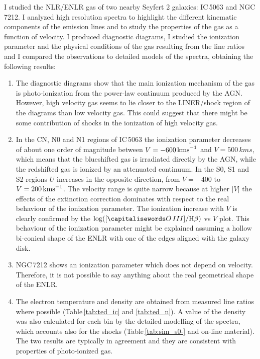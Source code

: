 \documentclass[../thesis.tex]{subfiles}
\begin{document}
I studied the NLR/ENLR gas of two nearby Seyfert 2 galaxies: IC\,5063 and NGC\,7212.
I analyzed high resolution spectra to highlight the different kinematic components of the emission lines and to study the properties of the gas as a function of velocity.
I produced diagnostic diagrams, I studied the ionization parameter and the physical conditions
of the gas resulting from the line ratios and I compared the observations to detailed models of the spectra, obtaining the following results: 

\begin{enumerate}
\item The diagnostic diagrams show that the main ionization mechanism of the gas is photo-ionization from the power-law continuum produced by the AGN.
However, high velocity gas seems to lie closer to the LINER/shock region of the diagrams than low velocity gas. 
This could suggest that there might be some contribution of shocks in the ionization of high velocity gas.

\item In the CN, N0 and N1 regions of IC\,5063 the ionization parameter decreases of about one order of magnitude between $V=-600\,\si{\kms}$ and $V=500\,\si{kms}$, which means that the blueshifted gas is irradiated directly by the AGN, while the redshifted gas is ionized by an attenuated continuum.
In the S0, S1 and S2 regions $U$ increases in the opposite direction, from $V=-400$ to $V=200\,\si{\kms}$.
The velocity range is quite narrow because at higher $\lvert V \rvert$ the effects of the extinction correction dominates with respect to the real behaviour of the ionization parameter.
The ionization increase with $V$ is clearly confirmed by the $\log([\ion{O}{III}]/\Hb)$ vs $V$ plot.
This behaviour of the ionization parameter might be explained assuming a hollow bi-conical shape of the ENLR with one of the edges aligned with the galaxy disk.

\item NGC\,7212 shows an ionization parameter which does not depend on velocity.
Therefore, it is not possible to say anything about the real geometrical shape of the ENLR.

\item The electron temperature and density are obtained from measured line ratios where possible (Table\,\ref{tab:ted_ic} and \ref{tab:ted_n}).
A value of the density was also calculated for each bin by the detailed modelling of the spectra, which accounts also for the shocks (Table\,\ref{tab:sim_s0-} and on-line material).
The two results are typically in agreement and they are consistent with properties of photo-ionized gas.


\end{enumerate}
\end{document}
